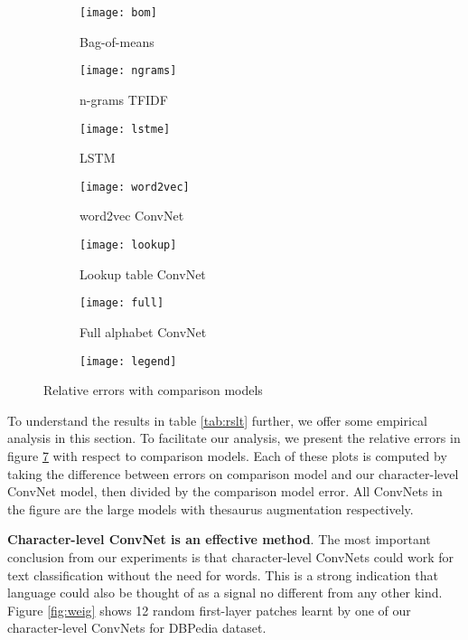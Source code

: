 \documentclass{article} \usepackage{nips15submit_e,times}
\begin{document}
\begin{figure}[ht]
  \centering
  \begin{subfigure}[b]{0.3\textwidth}
    \texttt{[image: bom]}
    \caption{Bag-of-means}
    \label{fig:bome}
  \end{subfigure}
  \begin{subfigure}[b]{0.3\textwidth}
    \texttt{[image: ngrams]}
    \caption{n-grams TFIDF}
    \label{fig:ngrm}
  \end{subfigure}
  \begin{subfigure}[b]{0.3\textwidth}
    \texttt{[image: lstme]}
    \caption{LSTM}
    \label{fig:lste}
  \end{subfigure}

  \begin{subfigure}[b]{0.3\textwidth}
    \texttt{[image: word2vec]}
    \caption{word2vec ConvNet}
    \label{fig:w2ve}
  \end{subfigure}
  \begin{subfigure}[b]{0.3\textwidth}
    \texttt{[image: lookup]}
    \caption{Lookup table ConvNet}
    \label{fig:look}
  \end{subfigure}
  \begin{subfigure}[b]{0.3\textwidth}
    \texttt{[image: full]}
    \caption{Full alphabet ConvNet}
    \label{fig:full}
  \end{subfigure}

  \begin{subfigure}[b]{0.7\textwidth}
    \texttt{[image: legend]}
  \end{subfigure}
  
  \caption{Relative errors with comparison models}
  \label{fig:comp}
\end{figure}

To understand the results in table \ref{tab:rslt} further, we offer some empirical analysis in this section. To facilitate our analysis, we present the relative errors in figure \ref{fig:comp} with respect to comparison models. Each of these plots is computed by taking the difference between errors on comparison model and our character-level ConvNet model, then divided by the comparison model error. All ConvNets in the figure are the large models with thesaurus augmentation respectively.

\textbf{Character-level ConvNet is an effective method}. The most important conclusion from our experiments is that character-level ConvNets could work for text classification without the need for words. This is a strong indication that language could also be thought of as a signal no different from any other kind. Figure \ref{fig:weig} shows 12 random first-layer patches learnt by one of our character-level ConvNets for DBPedia dataset.
\end{document}
